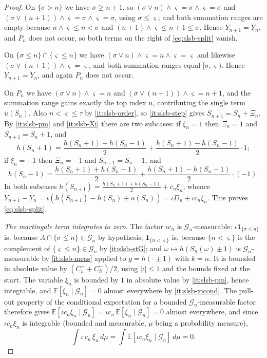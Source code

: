 \begin{proof}
On $\{\sigma>n\}$ we have $\sigma\ge n+1$, so
$(\sigma\vee n)\wedge\varsigma=\sigma\wedge\varsigma=\sigma$ and
$(\sigma\vee(n+1))\wedge\varsigma=\sigma\wedge\varsigma=\sigma$, using
$\sigma\le\varsigma$; and both summation ranges are empty because
$n\wedge\varsigma\le n<\sigma$ and $(n+1)\wedge\varsigma\le n+1\le\sigma$.
Hence $Y_{n+1}=Y_n$, and $P_n$ does not occur, so both terms on the right of
\eqref{eq:slsb-split} vanish.

On $\{\sigma\le n\}\cap\{\varsigma\le n\}$ we have
$(\sigma\vee n)\wedge\varsigma=n\wedge\varsigma=\varsigma$ and likewise
$(\sigma\vee(n+1))\wedge\varsigma=\varsigma$, and both summation ranges equal
$[\sigma,\varsigma)$. Hence $Y_{n+1}=Y_n$, and again $P_n$ does not occur.

On $P_n$ we have $(\sigma\vee n)\wedge\varsigma=n$ and
$(\sigma\vee(n+1))\wedge\varsigma=n+1$, and the summation range gains exactly
the top index $n$, contributing the single term $u(S_n)$. Also $n<\varsigma\le\tau$
by \ref{it:slsb-order}, so \ref{it:slsb-step} gives $S_{n+1}=S_n+\Xi_n$. By
\ref{it:slsb-pm} and \ref{it:slsb-Xi} there are two subcases: if $\xi_n=1$ then
$\Xi_n=1$ and $S_{n+1}=S_n+1$, and
\[
  h(S_n+1)=\frac{h(S_n+1)+h(S_n-1)}{2}
    +\frac{h(S_n+1)-h(S_n-1)}{2}\cdot1 ;
\]
if $\xi_n=-1$ then $\Xi_n=-1$ and $S_{n+1}=S_n-1$, and
\[
  h(S_n-1)=\frac{h(S_n+1)+h(S_n-1)}{2}
    +\frac{h(S_n+1)-h(S_n-1)}{2}\cdot(-1) .
\]
In both subcases
$h(S_{n+1})=\frac{h(S_n+1)+h(S_n-1)}{2}+c_n\xi_n$, whence
$Y_{n+1}-Y_n=\iota(h(S_{n+1})-h(S_n)+u(S_n))=\iota D_n+\iota c_n\xi_n$. This
proves \eqref{eq:slsb-split}.

\emph{The martingale term integrates to zero.} The factor $\iota c_n$ is
$\mathcal G_n$-measurable: $\iota\mathbf1_{\{\sigma\le n\}}$ is, because
$A\cap\{\sigma\le n\}\in\mathcal G_n$ by hypothesis; $\mathbf1_{\{n<\varsigma\}}$
is, because $\{n<\varsigma\}$ is the complement of
$\{\varsigma\le n\}\in\mathcal G_n$ by \ref{it:slsb-stG}; and
$\omega\mapsto h(S_n(\omega)\pm1)$ is $\mathcal G_n$-measurable by
\ref{it:slsb-meas} applied to $g=h(\cdot\pm1)$ with $k=n$. It is bounded in
absolute value by $(C_h^++C_h^-)/2$, using $|\iota|\le1$ and the bounds fixed at
the start. The variable $\xi_n$ is bounded by $1$ in absolute value by
\ref{it:slsb-pm}, hence integrable, and
$\mathbb E[\xi_n\mid\mathcal G_n]=0$ almost everywhere by \ref{it:slsb-xicond}.
The pull-out property of the conditional expectation for a bounded
$\mathcal G_n$-measurable factor therefore gives
$\mathbb E[\iota c_n\xi_n\mid\mathcal G_n]=\iota c_n\,
\mathbb E[\xi_n\mid\mathcal G_n]=0$ almost everywhere, and since
$\iota c_n\xi_n$ is integrable (bounded and measurable, $\mu$ being a
probability measure),
\begin{equation}\label{eq:slsb-mart}
  \int\iota\,c_n\,\xi_n\,d\mu
   =\int\mathbb E[\iota c_n\xi_n\mid\mathcal G_n]\,d\mu=0 .
\end{equation}


\end{proof}
